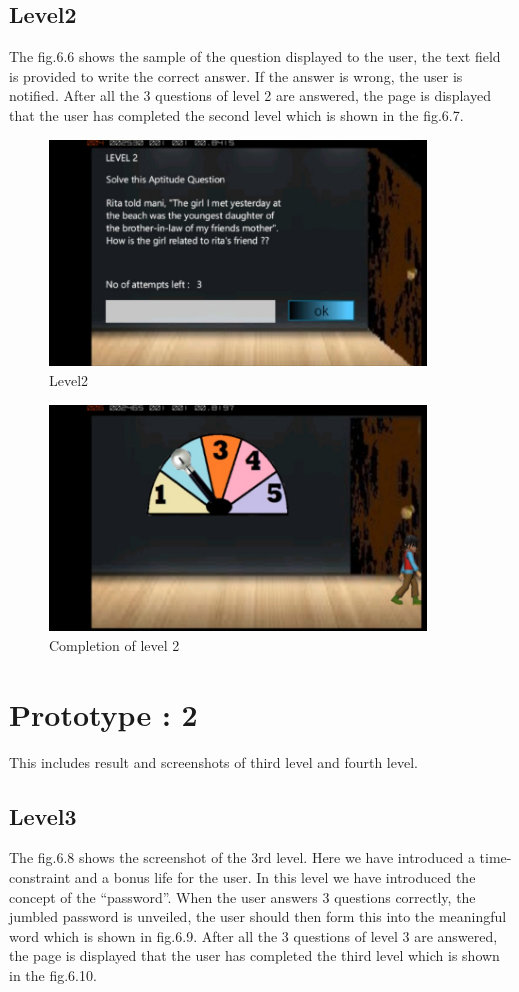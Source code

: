 \subsection{Level2}
\hspace{1cm}The fig.6.6 shows the sample of the question displayed to the user, the text field is provided 
to write the correct answer. If the answer is wrong, the user is notified.   
After all the 3 questions of level 2 are answered, the page is displayed that the user  has completed the second level which is shown in the fig.6.7.

\begin{figure}[htbp]
	\centering
	\includegraphics[width=10cm,height=6cm]{6.jpg}
	\caption{Level2}
\end{figure}
\begin{figure}[htbp]
	\centering
	\includegraphics[width=10cm,height=6cm]{7.jpg}
	\caption{Completion of level 2}
\end{figure}

\section{Prototype : 2}
\hspace{1cm} This includes result and screenshots of third level and fourth level.
\subsection{Level3}
\hspace{1cm}The fig.6.8 shows the screenshot of the 3rd level. Here we have introduced a time-constraint and a bonus life for the user. In this level we have introduced the concept of the “password”. When the user answers 3 questions correctly, the jumbled password is unveiled, the user should then form this into the meaningful word which is shown in fig.6.9.
After all the 3 questions of level 3 are answered, the page is displayed that the user  has completed the third level which is shown in the fig.6.10.


